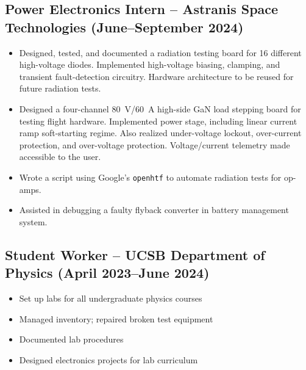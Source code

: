 	\subsection{Power Electronics Intern -- Astranis Space Technologies (June--September 2024)}
	\begin{itemize}[itemsep=0em]
		\item Designed, tested, and documented a radiation testing board for 16 different high-voltage diodes. Implemented high-voltage biasing, clamping, and transient fault-detection circuitry. Hardware architecture to be reused for future radiation tests.
		\item Designed a four-channel \qty{80}{\volt}/\qty{60}{\ampere} high-side GaN load stepping board for testing flight hardware. Implemented power stage, including linear current ramp soft-starting regime. Also realized under-voltage lockout, over-current protection, and over-voltage protection. Voltage/current telemetry made accessible to the user.
		\item Wrote a script using Google's \texttt{openhtf} to automate radiation tests for op-amps.
		\item Assisted in debugging a faulty flyback converter in battery management system.
	\end{itemize}
	\subsection{Student Worker -- UCSB Department of Physics (April 2023--June 2024)}
	\begin{center}
		\begin{minipage}{0.5\textwidth}
			\begin{itemize}[itemsep=0em]
				\item Set up labs for all undergraduate physics courses
				\item Managed inventory; repaired broken test equipment
			\end{itemize}
		\end{minipage}%
		\begin{minipage}{0.5\textwidth}
			\begin{itemize}[itemsep=0em]
				\item Documented lab procedures
				\item Designed electronics projects for lab curriculum
			\end{itemize}
		\end{minipage}
	\end{center}

